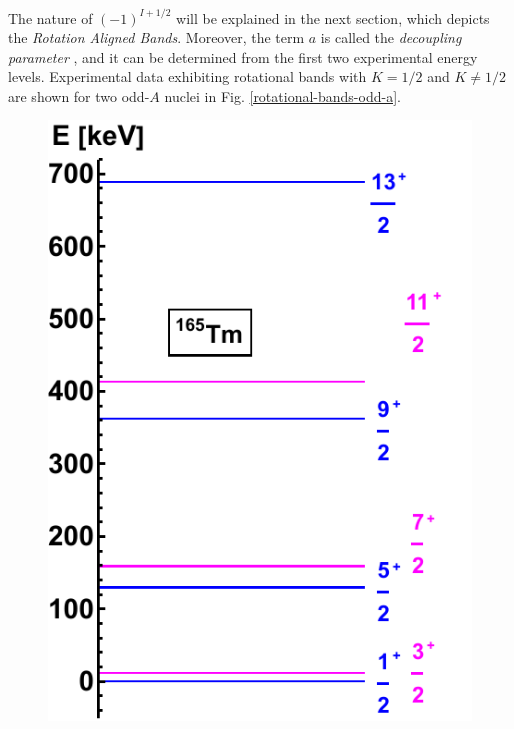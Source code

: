 The nature of $(-1)^{I+1/2}$ will be explained in the next section, which depicts the \emph{Rotation Aligned Bands}. Moreover, the term $a$ is called the \emph{decoupling parameter} \cite{bertulani2007nuclear}, and it can be determined from the first two experimental energy levels. Experimental data exhibiting rotational bands with $K=1/2$ and $K\neq 1/2$ are shown for two odd-$A$ nuclei in Fig. \ref{rotational-bands-odd-a}.
\begin{figure}
    \centering
    \includegraphics[scale=0.7]{Chapters/Figures/Tm165-Rotational-Bands.pdf}

\end{figure}
